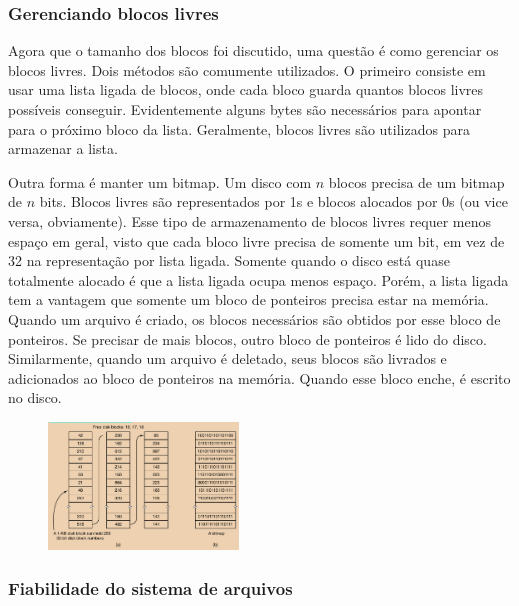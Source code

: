 \documentclass{article}
\begin{document}
\subsubsection{Gerenciando blocos livres}

Agora que o tamanho dos blocos foi discutido, uma questão é como gerenciar os blocos livres. Dois métodos são comumente utilizados. O primeiro consiste em usar uma lista ligada de blocos, onde cada bloco guarda quantos blocos livres possíveis conseguir. Evidentemente alguns bytes são necessários para apontar para o próximo bloco da lista. Geralmente, blocos livres são utilizados para armazenar a lista. 

Outra forma é manter um bitmap. Um disco com $n$ blocos precisa de um bitmap de $n$ bits. Blocos livres são representados por 1s e blocos alocados por 0s (ou vice versa, obviamente). Esse tipo de armazenamento de blocos livres requer menos espaço em geral, visto que cada bloco livre precisa de somente um bit, em vez de 32 na representação por lista ligada. Somente quando o disco está quase totalmente alocado é que a lista ligada ocupa menos espaço. Porém, a lista ligada tem a vantagem que somente um bloco de ponteiros precisa estar na memória. Quando um arquivo é criado, os blocos necessários são obtidos por esse bloco de ponteiros. Se precisar de mais blocos, outro bloco de ponteiros é lido do disco. Similarmente, quando um arquivo é deletado, seus blocos são livrados e adicionados ao bloco de ponteiros na memória. Quando esse bloco enche, é escrito no disco.

\begin{figure}[h]
  \begin{center}
    \includegraphics[width=0.45\textwidth]{img/5-18.png}
  \end{center}
  \caption{}
  \label{fig:}
\end{figure}

\subsubsection{Fiabilidade do sistema de arquivos}
\end{document}
